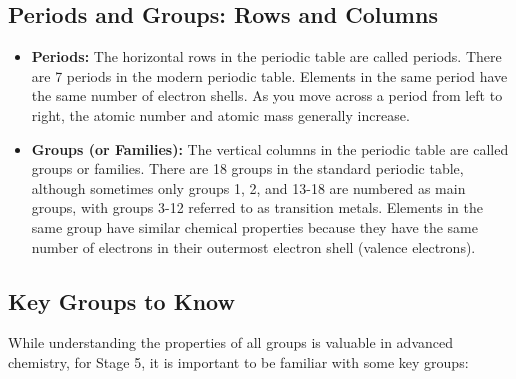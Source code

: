 \subsection{Periods and Groups: Rows and Columns}

\begin{itemize}
    \item \textbf{Periods:} The horizontal rows in the periodic table are called periods. There are 7 periods in the modern periodic table. Elements in the same period have the same number of electron shells. As you move across a period from left to right, the atomic number and atomic mass generally increase.

    \item \textbf{Groups (or Families):} The vertical columns in the periodic table are called groups or families. There are 18 groups in the standard periodic table, although sometimes only groups 1, 2, and 13-18 are numbered as main groups, with groups 3-12 referred to as transition metals. Elements in the same group have similar chemical properties because they have the same number of electrons in their outermost electron shell (valence electrons).
\end{itemize}

\subsection{Key Groups to Know}


While understanding the properties of all groups is valuable in advanced chemistry, for Stage 5, it is important to be familiar with some key groups:

